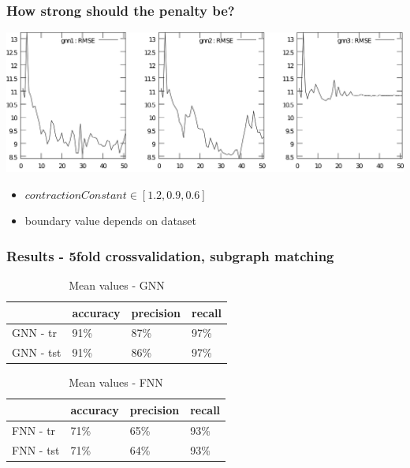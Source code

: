 \documentclass{beamer}
\begin{document}
\begin{frame}
\frametitle{How strong should the penalty be?}
\begin{center}
	\includegraphics[scale=0.065]{img/rmse1_clipped}
\end{center}
\begin{itemize}
	\item $contractionConstant \in [1.2, 0.9, 0.6]$
	\item boundary value depends on dataset
\end{itemize}
\end{frame}

\begin{frame}
\frametitle{Results - 5fold crossvalidation, subgraph matching}
\setlength{\tabcolsep}{2pt}
\begin{table}[h!]
	\begin{center}
	\begin{tabular}{llll}
	\toprule
	& accuracy & precision & recall \\
	\midrule
	GNN - tr &	91\% &  87\%&  97\% \\
	GNN - tst &	91\% &  86\% &  97\% \\
	\bottomrule
	\end{tabular}
	\caption{Mean values - GNN}
	\end{center}
\end{table}

\begin{table}[h!]
	\begin{center}
	\begin{tabular}{llll}
	\toprule
	& accuracy & precision & recall \\
	\midrule
	FNN - tr &	71\% &  65\% & 93\% \\
	FNN - tst &	71\% &  64\% &  93\% \\
	\bottomrule
	\end{tabular}
	\caption{Mean values - FNN}
	\end{center}
\end{table}
\end{frame}
\end{document}
